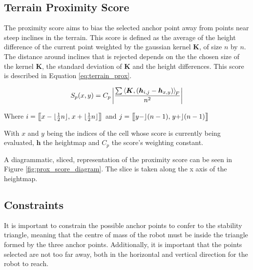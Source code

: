    \subsection{Terrain Proximity Score}
    The proximity score aims to bias the selected anchor point away from points near steep inclines in the terrain. This score is defined as the average of the height
    difference of the current point weighted by the gaussian kernel \(\boldsymbol{K}\), of size \(n\) by \(n\). The distance around inclines that is rejected depends on the the
    chosen size of the kernel \(\boldsymbol{K}\), the standard deviation of \(\boldsymbol{K}\) and the height differences. This score is described in Equation
    \ref{eq:terrain_prox}.

    \begin{equation} \label{eq:terrain_prox}
        S_p(x,y) = C_p\left|\frac{\sum\left\langle\boldsymbol{K},(\boldsymbol{h}_{i,j}-\boldsymbol{h}_{x,y})\right\rangle _{\mkern-3mu F}}{n^2}\right|
    \end{equation}

    \begin{center}
        Where \(i = \big[\mkern-4.7mu\big[x- \lfloor\frac{1}{2}n\rfloor,\mkern2mu x+\lfloor\frac{1}{2}n\rfloor\big]\mkern-4.7mu\big]\) 
        and \(j = \big[\mkern-4.7mu\big[y-\rfloor (n-1),\mkern2mu y+\rfloor (n-1)\big]\mkern-4.7mu\big]\)
    \end{center}
    
    \noindent
    With \(x\) and \(y\) being the indices of the cell whose score is currently being evaluated, \(\boldsymbol{h}\) the
    heightmap and \(C_p\) the score's weighting constant.
    
    A diagrammatic, sliced, representation of the proximity score can be seen in Figure \ref{fig:prox_score_diagram}. The
    slice is taken along the x axis of the heightmap.

    \subsection{Constraints}
    It is important to constrain the possible anchor points to confer to the stability triangle,
    meaning that the centre of mass of the robot must be inside the triangle formed by the three
    anchor points. Additionally, it is important that the points selected are not too far away,
    both in the horizontal and vertical direction for the robot to reach.


